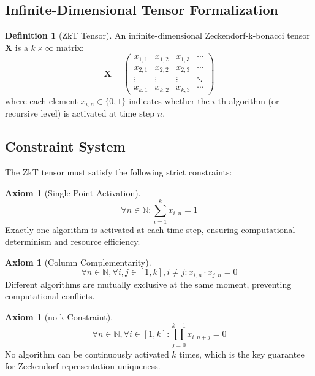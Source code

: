 \documentclass[12pt]{article}
\theoremstyle{plain}
\theoremstyle{definition}
\newtheorem{definition}[theorem]{Definition}
\newtheorem{axiom}[theorem]{Axiom}
\newcommand{\N}{\mathbb{N}}
\begin{document}
\subsection{Infinite-Dimensional Tensor Formalization}

\begin{definition}[ZkT Tensor]
An infinite-dimensional Zeckendorf-k-bonacci tensor $\mathbf{X}$ is a $k \times \infty$ matrix:
\begin{equation}
\mathbf{X} = \begin{pmatrix}
x_{1,1} & x_{1,2} & x_{1,3} & \cdots \\
x_{2,1} & x_{2,2} & x_{2,3} & \cdots \\
\vdots & \vdots & \vdots & \ddots \\
x_{k,1} & x_{k,2} & x_{k,3} & \cdots
\end{pmatrix}
\end{equation}
where each element $x_{i,n} \in \{0,1\}$ indicates whether the $i$-th algorithm (or recursive level) is activated at time step $n$.
\end{definition}

\subsection{Constraint System}

The ZkT tensor must satisfy the following strict constraints:

\begin{axiom}[Single-Point Activation]
\begin{equation}
\forall n \in \N: \sum_{i=1}^k x_{i,n} = 1
\end{equation}
Exactly one algorithm is activated at each time step, ensuring computational determinism and resource efficiency.
\end{axiom}

\begin{axiom}[Column Complementarity]
\begin{equation}
\forall n \in \N, \forall i,j \in [1,k], i \neq j: x_{i,n} \cdot x_{j,n} = 0
\end{equation}
Different algorithms are mutually exclusive at the same moment, preventing computational conflicts.
\end{axiom}

\begin{axiom}[no-k Constraint]
\begin{equation}
\forall n \in \N, \forall i \in [1,k]: \prod_{j=0}^{k-1} x_{i,n+j} = 0
\end{equation}
No algorithm can be continuously activated $k$ times, which is the key guarantee for Zeckendorf representation uniqueness.
\end{axiom}
\end{document}
